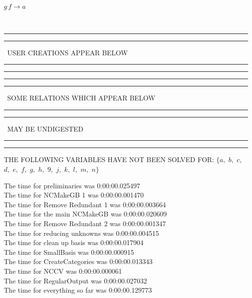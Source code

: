 \documentclass[rep10,leqno]{report}
\begin{document}
\begin{minipage}{6in}
$
g\,
 f\rightarrow a
$
\end{minipage}\\
\rule[2pt]{6in}{1pt}\hfil\break
\rule[2.5pt]{1.701in}{1pt}
\ USER CREATIONS APPEAR BELOW\ 
\rule[2.5pt]{1.701in}{1pt}\hfil\break
\rule[2pt]{6in}{1pt}\hfil\break
\rule[2pt]{6in}{4pt}\hfil\break
\rule[2pt]{1.45in}{4pt}
\ SOME RELATIONS WHICH APPEAR BELOW\ 
\rule[2pt]{1.45in}{4pt}\hfil\break
\rule[2pt]{2.18in}{4pt}
\ MAY BE UNDIGESTED\ 
\rule[2pt]{2.18in}{4pt}\hfil\break
\rule[2pt]{6in}{4pt}\hfil\break
THE FOLLOWING VARIABLES HAVE NOT BEEN SOLVED FOR:\hfil\break
$\{a,
$ $
b,
$ $
c,
$ $
d,
$ $
e,
$ $
f,
$ $
g,
$ $
h,
$ $
9,
$ $
j,
$ $
k,
$ $
l,
$ $
m,
$ $
n\}$
\smallskip\\
\vspace{10pt}

\noindent
The time for preliminaries was 0:00:00.025497\\
The time for NCMakeGB 1 was 0:00:00.001470\\
The time for Remove Redundant 1 was 0:00:00.003664\\
The time for the main NCMakeGB was 0:00:00.020609\\
The time for Remove Redundant 2 was 0:00:00.001347\\
The time for reducing unknowns was 0:00:00.004515\\
The time for clean up basis was 0:00:00.017904\\
The time for SmallBasis was 0:00:00.000915\\
The time for CreateCategories was 0:00:00.013343\\
The time for NCCV was 0:00:00.000061\\
The time for RegularOutput was 0:00:00.027032\\
The time for everything so far was 0:00:00.129773\\
\end{document}
